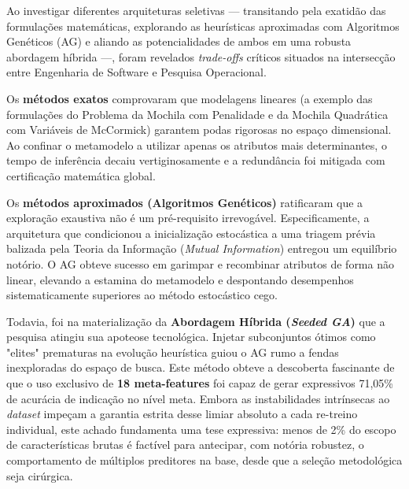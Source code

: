 \documentclass[12pt]{article}
\begin{document}
Ao investigar diferentes arquiteturas seletivas — transitando pela exatidão das formulações matemáticas, explorando as heurísticas aproximadas com Algoritmos Genéticos (AG) e aliando as potencialidades de ambos em uma robusta abordagem híbrida —, foram revelados \textit{trade-offs} críticos situados na intersecção entre Engenharia de Software e Pesquisa Operacional.

Os \textbf{métodos exatos} comprovaram que modelagens lineares (a exemplo das formulações do Problema da Mochila com Penalidade e da Mochila Quadrática com Variáveis de McCormick) garantem podas rigorosas no espaço dimensional. Ao confinar o metamodelo a utilizar apenas os atributos mais determinantes, o tempo de inferência decaiu vertiginosamente e a redundância foi mitigada com certificação matemática global.

Os \textbf{métodos aproximados (Algoritmos Genéticos)} ratificaram que a exploração exaustiva não é um pré-requisito irrevogável. Especificamente, a arquitetura que condicionou a inicialização estocástica a uma triagem prévia balizada pela Teoria da Informação (\textit{Mutual Information}) entregou um equilíbrio notório. O AG obteve sucesso em garimpar e recombinar atributos de forma não linear, elevando a estamina do metamodelo e despontando desempenhos sistematicamente superiores ao método estocástico cego.

Todavia, foi na materialização da \textbf{Abordagem Híbrida (\textit{Seeded GA})} que a pesquisa atingiu sua apoteose tecnológica. Injetar subconjuntos ótimos como "elites" prematuras na evolução heurística guiou o AG rumo a fendas inexploradas do espaço de busca. Este método obteve a descoberta fascinante de que o uso exclusivo de \textbf{18 meta-features} foi capaz de gerar expressivos 71,05\% de acurácia de indicação no nível meta. Embora as instabilidades intrínsecas ao \textit{dataset} impeçam a garantia estrita desse limiar absoluto a cada re-treino individual, este achado fundamenta uma tese expressiva: menos de 2\% do escopo de características brutas é factível para antecipar, com notória robustez, o comportamento de múltiplos preditores na base, desde que a seleção metodológica seja cirúrgica.
\end{document}
